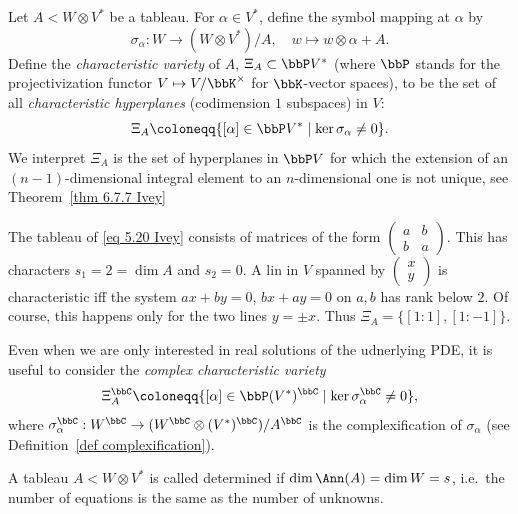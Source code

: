 \begin{defn}\label{def symbol map}
    Let $A<W\otimes V^\ast$ be a tableau. For $\alpha\in V^\ast$, define the symbol mapping at $\alpha$ by 
    \[\sigma_\alpha:W\to (W\otimes V^\ast)\slash A,\quad w\mapsto w\otimes\alpha + A.\]
    Define the \emph{characteristic variety} of $A$, $\Xi_A\subset \bbP V^\ast$ (where $\bbP$ stands for the projectivization functor $V\mapsto V\slash \bbK^\times$ for $\bbK$-vector spaces), to be the set of all \emph{characteristic hyperplanes} (codimension $1$ subspaces) in $V$:
    \[\Xi_A\coloneqq \{[\alpha]\in \bbP V^\ast\mid \ker \sigma_\alpha\neq 0\}.\]
    We interpret $\Xi_A$ is the set of hyperplanes in $\bbP V$ for which the extension of an $(n-1)$-dimensional integral element to an $n$-dimensional one is not unique, see Theorem~\ref{thm 6.7.7 Ivey}
\end{defn}

\begin{example}
    The tableau of \ref{eq 5.20 Ivey} consists of matrices of the form $\left(\begin{smallmatrix}
        a&b\\b&a
    \end{smallmatrix}\right)$. This has characters $s_1=2=\dim A$ and $s_2=0$. A lin in $V$ spanned by $\left(\begin{smallmatrix}
        x\\ y
    \end{smallmatrix}\right)$ is characteristic iff the system $ax+by=0$, $bx+ay=0$ on $a,b$ has rank below $2$. Of course, this happens only for the two lines $y=\pm x$. Thus $\Xi_A=\{[1:1],[1:-1]\}$. 
\end{example}

Even when we are only interested in real solutions of the udnerlying PDE, it is useful to consider the \emph{complex characteristic variety}
\[\Xi^\bbC_A\coloneqq \{[\alpha]\in \bbP (V^\ast)^\bbC\mid \ker \sigma_\alpha^\bbC\neq 0\},\]
where $\sigma^\bbC_\alpha:W^\bbC\to (W^\bbC\otimes (V^\ast)^\bbC)\slash A^\bbC$ is the complexification of $\sigma_\alpha$ (see Definition~\ref{def complexification}).

\begin{defn}
    A tableau $A<W\otimes V^\ast$ is called determined if $\dim \Ann(A)=\dim W=s$, i.e.\ the number of equations is the same as the number of unknowns.
\end{defn}

